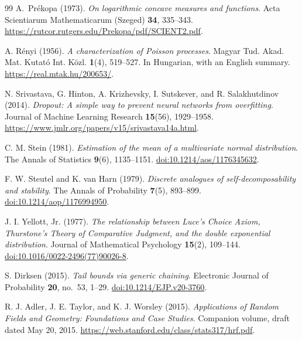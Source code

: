 \documentclass[11pt,letterpaper]{article}
\newcommand{\vSix}[1]{{\color{magenta}#1}}
\theoremstyle{remark}
\begin{document}
\begin{thebibliography}{99}
A.~Pr\'ekopa (1973).
\emph{On logarithmic concave measures and functions}.
Acta Scientiarum Mathematicarum (Szeged) \textbf{34}, 335--343.
\url{https://rutcor.rutgers.edu/Prekopa/pdf/SCIENT2.pdf}.

A. R\'enyi (1956).
\emph{A characterization of Poisson processes}.
Magyar Tud. Akad. Mat. Kutat\'o Int. K\"ozl. \textbf{1}(4), 519--527.
In Hungarian, with an English summary.
\url{https://real.mtak.hu/200653/}.

N. Srivastava, G. Hinton, A. Krizhevsky, I. Sutskever, and
R. Salakhutdinov (2014).
\emph{Dropout: A simple way to prevent neural networks from overfitting}.
Journal of Machine Learning Research \textbf{15}(56), 1929--1958.
\url{https://www.jmlr.org/papers/v15/srivastava14a.html}.

C. M. Stein (1981).
\emph{Estimation of the mean of a multivariate normal distribution}.
The Annals of Statistics \textbf{9}(6), 1135--1151.
\href{https://doi.org/10.1214/aos/1176345632}{doi:10.1214/aos/1176345632}.

F. W. Steutel and K. van Harn (1979).
\emph{Discrete analogues of self-decomposability and stability}.
The Annals of Probability \textbf{7}(5), 893--899.
\href{https://doi.org/10.1214/aop/1176994950}{doi:10.1214/aop/1176994950}.

J. I. Yellott, Jr. (1977).
\emph{The relationship between Luce's Choice Axiom, Thurstone's Theory
of Comparative Judgment, and the double exponential distribution}.
Journal of Mathematical Psychology \textbf{15}(2), 109--144.
\href{https://doi.org/10.1016/0022-2496(77)90026-8}{doi:10.1016/0022-2496(77)90026-8}.

S. Dirksen (2015).
\emph{Tail bounds via generic chaining}.
Electronic Journal of Probability \textbf{20}, no.~53, 1--29.
\href{https://doi.org/10.1214/EJP.v20-3760}{doi:10.1214/EJP.v20-3760}.

\vSix{R. J. Adler, J. E. Taylor, and K. J. Worsley (2015).
\emph{Applications of Random Fields and Geometry: Foundations and Case Studies}.
Companion volume, draft dated May 20, 2015.
\url{https://web.stanford.edu/class/stats317/hrf.pdf}.}

\end{thebibliography}

\clearpage
\appendix
{}
\end{document}
